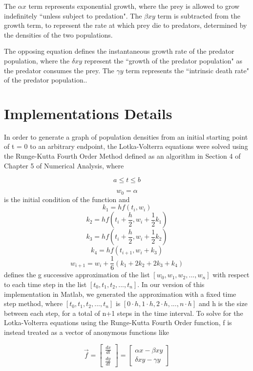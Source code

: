 \documentclass[12pt]{article}
\begin{document}
The \(\alpha x\) term represents exponential growth, where the prey is allowed to grow indefinitely ``unless subject to predation". The \(\beta xy\) term is subtracted from the growth term, to represent the rate at which prey die to predators,  determined by the densities of the two populations. \cite{foundation_2023}

The opposing equation defines the instantaneous growth rate of the predator population, where the  \(\delta xy\) represent the ``growth of the predator population" as the predator consumes the prey. The \(\gamma y\) term represents the ``intrinsic death rate" of the predator population.\cite{foundation_2023}.

\newpage

\section{Implementations Details}

In order to generate a graph of population densities from an initial starting point of t = 0 to an arbitrary endpoint,  the Lotka-Volterra equations were solved using the Runge-Kutta Fourth Order Method defined as an algorithm in Section 4 of Chapter 5 of Numerical Analysis\cite{burden_faires_burden_2016}, where 
    
\[a\leq t \leq b\]

\[w_{0} = \alpha \]is the initial condition of the function and
\[k_{1} = hf(t_{i},w_{i}) \]
\[k_{2} = hf(t_{i}+\frac{h}{2},w_{i}+\frac{1}{2}k_{1}) \]
\[k_{3} = hf(t_{i}+\frac{h}{2},w_{i}+\frac{1}{2}k_{2}) \]
\[k_{4} = hf(t_{i+1},w_{i}+k_{3}) \]
\[w_{i+1} = w_{i}+\frac{1}{6}(k_{1}+2k_{2}+2k_{3}+k_{4}) \]
defines the g successive approximation of the list \([w_{0},w_{1},w_{2},...,w_{n}]\) with respect to each time step in the list \([t_{0},t_{1},t_{2},...,t_{n}]\). In our version of this implementation in Matlab, we generated the approximation with a fixed time step method, where \([t_{0},t_{1},t_{2},...,t_{n}]\) is \([0\cdot h,1\cdot h,2\cdot h,..., n\cdot h]\) and h is the size between each step, for a total of n+1 steps in the time interval.  To solve for the Lotka-Volterra equations using the Runge-Kutta Fourth Order function, f is instead treated as a vector of anonymous functions like 

\[\vec{f} = 
\begin{bmatrix}
\frac{dx}{dt}\\ \frac{dy}{dt}
\end{bmatrix}
=
\begin{bmatrix}
\alpha x-\beta xy\\ \delta xy- \gamma y
\end{bmatrix}\]
\end{document}
